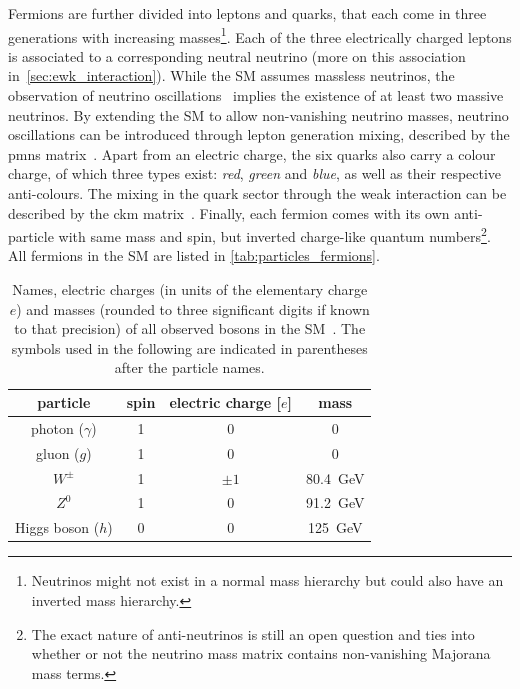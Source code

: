 
Fermions are further divided into leptons and quarks, that each come in three generations with increasing masses\footnote{Neutrinos might not exist in a normal mass hierarchy but could also have an inverted mass hierarchy.}.
Each of the three electrically charged leptons is associated to a corresponding neutral neutrino (more on this association in~\cref{sec:ewk_interaction}). While the SM assumes massless neutrinos, the observation of neutrino oscillations~\cite{Fukuda:1998mi} implies the existence of at least two massive neutrinos.
By extending the SM to allow non-vanishing neutrino masses, neutrino oscillations can be introduced through lepton generation mixing, described by the \gls{pmns} matrix~\cite{PMNS:1962mu}.
Apart from an electric charge, the six quarks also carry a colour charge, of which three types exist: \textit{red}, \textit{green} and \textit{blue}, as well as their respective anti-colours.
The mixing in the quark sector through the weak interaction can be described by the \gls{ckm} matrix~\cite{PhysRevLett.10.531,CKM:1973fv}.
Finally, each fermion comes with its own anti-particle with same mass and spin, but inverted charge-like quantum numbers\footnote{The exact nature of anti-neutrinos is still an open question and ties into whether or not the neutrino mass matrix contains non-vanishing Majorana mass terms.}.
All fermions in the SM are listed in \cref{tab:particles_fermions}.


\begin{table}
	\centering
	\setlength\heavyrulewidth{0.2ex}
	\small
	\caption{Names, electric charges (in units of the elementary charge $e$) and masses (rounded to three significant digits if known to that precision) of all observed bosons in the SM~\cite{pdg2020}. The symbols used in the following are indicated in parentheses after the particle names.}
	\begin{tabular} {c c c c}
	\toprule
		particle & spin & electric charge [$e$]& mass \\ 
	\midrule
		photon ($\gamma$) & 1 & 0 & 0\\
		gluon ($g$) & 1 & 0 & 0 \\
		$W^\pm$ & 1 & $\pm 1$ & \SI{80.4}{\GeV} \\
		$Z^0$ & 1 & 0 & \SI{91.2}{\GeV} \\
		Higgs boson ($h$) & 0 & 0 & \SI{125}{\GeV} \\
	\bottomrule					
	\end{tabular}\vspace{2mm}
	\label{tab:particles_bosons}   
\end{table}

